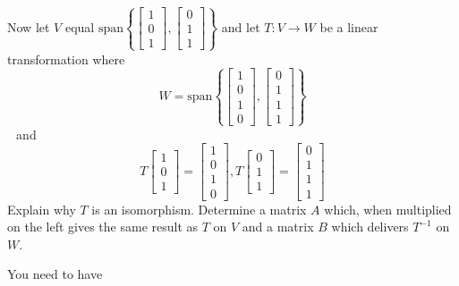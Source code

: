 \documentclass{ximera}
\begin{document}
\begin{problem}\label{prb:10.85} Now let $V$ equal $\mbox{span}\left\{ \left[
\begin{array}{c}
1 \\
0 \\
1
\end{array}
\right] ,\left[
\begin{array}{c}
0 \\
1 \\
1
\end{array}
\right] \right\} $ and let $T:V\rightarrow W$ be a linear transformation
where
\begin{equation*}
W=\mbox{span}\left\{ \left[
\begin{array}{c}
1 \\
0 \\
1 \\
0
\end{array}
\right] ,\left[
\begin{array}{c}
0 \\
1 \\
1 \\
1
\end{array}
\right] \right\}
\end{equation*}
$\ $\ and
\begin{equation*}
T\left[
\begin{array}{c}
1 \\
0 \\
1
\end{array}
\right] =\left[
\begin{array}{c}
1 \\
0 \\
1 \\
0
\end{array}
\right] ,T\left[
\begin{array}{c}
0 \\
1 \\
1
\end{array}
\right] =\left[
\begin{array}{c}
0 \\
1 \\
1 \\
1
\end{array}
\right]
\end{equation*}
Explain why $T$ is an isomorphism. Determine a matrix $A$ which, when
multiplied on the left gives the same result as $T$ on $V$ and a matrix $B$
which delivers $T^{-1}$ on $W$. 
\begin{hint}You need to have

\end{hint}
\end{problem}
\end{document}
